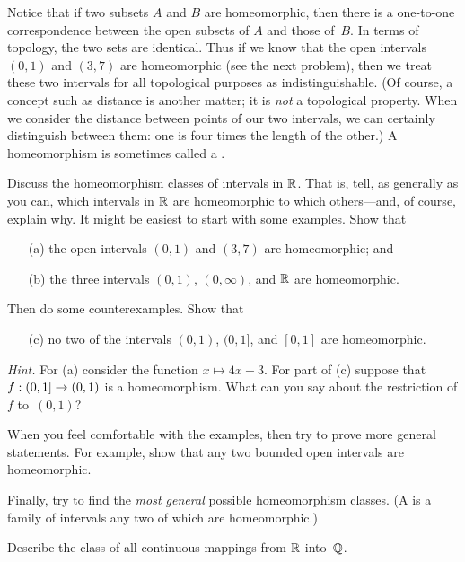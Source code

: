 Notice that if two subsets $A$ and $B$ are homeomorphic, then there is a one-to-one
correspondence between the open subsets of $A$ and those of~$B$.  In terms of topology, the
two sets are identical. Thus if we know that the open intervals $(0,1)$ and $(3,7)$ are
homeomorphic (see the next problem), then we treat these two intervals for all topological
purposes as indistinguishable.  (Of course, a concept such as distance is another matter; it
is \emph{not} a topological property.  When we consider the distance between points of our two
intervals, we can certainly distinguish between them: one is four times the length of the
other.)  A homeomorphism is sometimes called a
.

\begin{prob} Discuss the homeomorphism classes of intervals in $\mathbb{R}$.  That is, tell, as generally
as you can, which intervals in $\mathbb{R}$ are homeomorphic to which others---and, of course, explain
why.  It might be easiest to start with some examples.  Show that
 \begin{enumerate}
  \item[(a)] the open intervals $(0,1)$ and $(3,7)$ are homeomorphic; and
  \item[(b)] the three intervals $(0,1)$, $(0,\infty)$, and $\mathbb{R}$ are homeomorphic.
 \end{enumerate}
Then do some counterexamples.  Show that
 \begin{enumerate}
  \item[(c)] no two of the intervals $(0,1)$, $(0,1]$, and $[0,1]$ are homeomorphic.
 \end{enumerate}
\emph{Hint.}  For (a) consider the function $x \mapsto 4x+3$.  For part of (c) suppose that
$f:(0,1] \rightarrow (0,1)$ is a homeomorphism. What can you say about the restriction of $f$
to~$(0,1)$?

When you feel comfortable with the examples, then try to prove more general statements.  For
example, show that any two bounded open intervals are homeomorphic.

Finally, try to find the \emph{most general} possible homeomorphism classes.  (A
 is a family of intervals any two of which
are homeomorphic.)
\end{prob}

\begin{prob}  Describe the class of all continuous mappings from $\mathbb{R}$ into~$\mathbb{Q}$.
\end{prob}


\endinput
